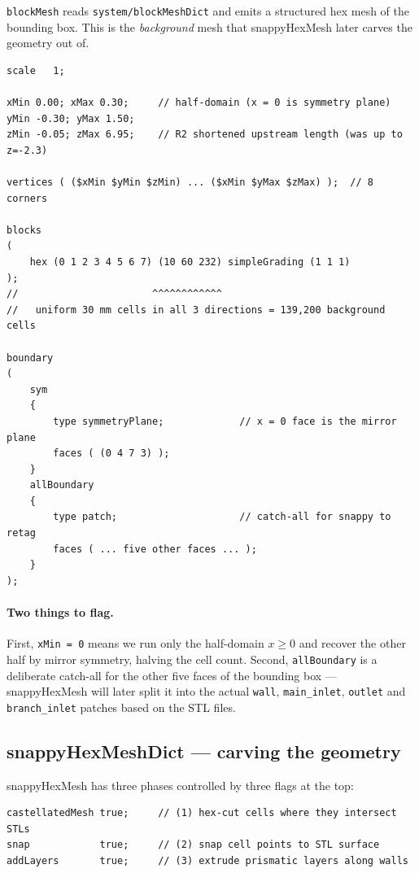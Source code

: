 \documentclass[11pt,a4paper]{article}
\begin{document}
\texttt{blockMesh} reads \texttt{system/blockMeshDict} and emits a
structured hex mesh of the bounding box. This is the \emph{background}
mesh that snappyHexMesh later carves the geometry out of.

\begin{lstlisting}[style=foamstyle,caption={\texttt{system/blockMeshDict} (key parts)}]
scale   1;

xMin 0.00; xMax 0.30;     // half-domain (x = 0 is symmetry plane)
yMin -0.30; yMax 1.50;
zMin -0.05; zMax 6.95;    // R2 shortened upstream length (was up to z=-2.3)

vertices ( ($xMin $yMin $zMin) ... ($xMin $yMax $zMax) );  // 8 corners

blocks
(
    hex (0 1 2 3 4 5 6 7) (10 60 232) simpleGrading (1 1 1)
);
//                       ^^^^^^^^^^^^
//   uniform 30 mm cells in all 3 directions = 139,200 background cells

boundary
(
    sym
    {
        type symmetryPlane;             // x = 0 face is the mirror plane
        faces ( (0 4 7 3) );
    }
    allBoundary
    {
        type patch;                     // catch-all for snappy to retag
        faces ( ... five other faces ... );
    }
);
\end{lstlisting}

\paragraph{Two things to flag.}
First, \texttt{xMin = 0} means we run only the half-domain
$x\ge 0$ and recover the other half by mirror symmetry, halving the
cell count. Second, \texttt{allBoundary} is a deliberate catch-all
for the other five faces of the bounding box --- snappyHexMesh will
later split it into the actual \texttt{wall}, \texttt{main\_inlet},
\texttt{outlet} and \texttt{branch\_inlet} patches based on the STL
files.

\subsection{snappyHexMeshDict --- carving the geometry}

snappyHexMesh has three phases controlled by three flags at the top:

\begin{lstlisting}[style=foamstyle]
castellatedMesh true;     // (1) hex-cut cells where they intersect STLs
snap            true;     // (2) snap cell points to STL surface
addLayers       true;     // (3) extrude prismatic layers along walls
\end{lstlisting}
\end{document}
